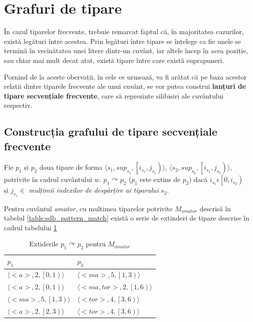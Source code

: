 \section{Grafuri de tipare}

În cazul tiparelor frecvente, trebuie remarcat faptul că, în majoritatea cazurilor, există legături între acestea. Prin legături între tipare se înțelege ca fie unele se termină în vecinătatea unei litere dintr-un cuvânt, iar altele încep în acea poziție, sau chiar mai mult decat atat, există tipare între care există suprapuneri. 

Pornind de la aceste obervații, în cele ce urmează, va fi arătat că pe baza acestor relatii dintre tiparele frecvente ale unui cuvânt, se vor putea construi \textbf{lanțuri de tipare secvențiale frecvente}, care să reprezinte silibisiri ale cuvântului respectiv.

\subsection{Construcția grafului de tipare secvențiale frecvente}
\begin{defi}
Fie $p_1$ și $p_2$ doua tipare de forma  $\langle s_1,sup_{s_1}, \left[i_{s_1},j_{s_1}\right) \rangle$, $\langle s_2,sup_{s_2}, \left[i_{s_2},j_{s_2}\right)\rangle $, potrivite în cadrul cuvântului $w$. $p_1 \curvearrowright p_2$ ($p_1$ este extins de $p_2$) dacă $i_{s_1} \epsilon \left[0, i_{s_2}\right)$ și $j_{s_1}\in $ \textit{mulțimii indexilor de despărțire ai tiparului} $s_2$. 
\end{defi}

\begin{ex}
Pentru cuvântul \textit{amator}, cu multimea tiparelor potrivite $M_{amator}$ descrisă în tabelul \ref{table:sdb_pattern_match} există o serie de extinderi de tipare descrise în cadrul tabelului \ref{table:sdb_pattern_extensions}
\end{ex}

\begin{table}[h!]
\centering    
\begin{tabular}{|l|l|}    
\hline      
$p_1$ & $p_2$\\
\hline
$\langle<a>, 2, \left[0,1\right)\rangle$ & $\langle<ma>, 5, \left[1,3\right)\rangle$  \\
$\langle<a>, 2, \left[0,1\right)\rangle$ & $\langle<ma,tor>, 2, \left[1,6\right)\rangle$  \\
$\langle<ma>, 5, \left[1,3\right)\rangle$ & $\langle<tor>, 4, \left[3,6\right)\rangle$  \\
$\langle<a>, 2, \left[2,3\right)\rangle$ & $\langle<tor>, 4, \left[3,6\right)\rangle$  \\
\hline
\end{tabular}
\caption{Extiderile $p_1 \curvearrowright p_2$ pentru $M_{amator}$}
\label{table:sdb_pattern_extensions}               
\end{table}  

